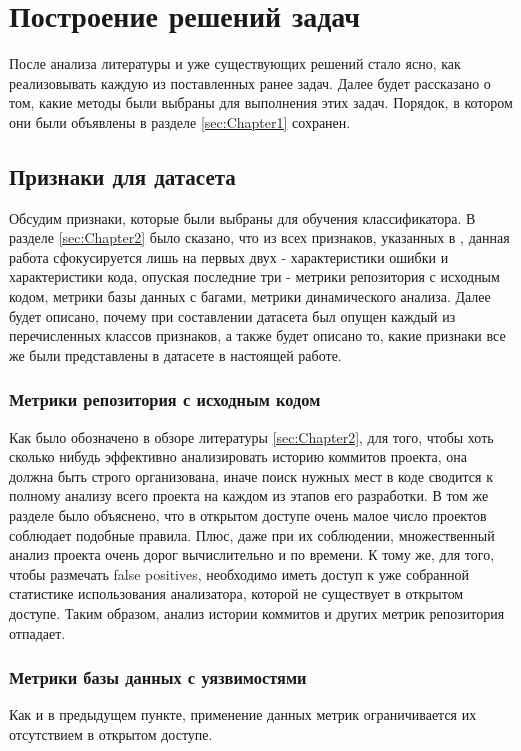 \section{Построение решений задач}
\label{sec:Chapter3} 

После анализа литературы и уже существующих решений стало ясно, как реализовывать каждую из поставленных ранее задач. Далее будет рассказано о том, какие методы были выбраны для выполнения этих задач. Порядок, в котором они были объявлены в разделе \ref{sec:Chapter1} сохранен.

\subsection{Признаки для датасета}
\label{sec:dataset} 

Обсудим признаки, которые были выбраны для обучения классификатора. В разделе \ref{sec:Chapter2} было сказано, что из всех признаков, указанных в \cite{HECKMAN2011363}, данная работа сфокусируется лишь на первых двух - характеристики ошибки и характеристики кода, опуская последние три - метрики репозитория с исходным кодом, метрики базы данных с багами, метрики динамического анализа. Далее будет описано, почему при составлении датасета был опущен каждый из перечисленных классов признаков, а также будет описано то, какие признаки все же были представлены в датасете в настоящей работе.

\subsubsection{Метрики репозитория с исходным кодом}
Как было обозначено в обзоре литературы \ref{sec:Chapter2}, для того, чтобы хоть сколько нибудь эффективно анализировать историю коммитов проекта, она должна быть строго организована, иначе поиск нужных мест в коде сводится к полному анализу всего проекта на каждом из этапов его разработки. В том же разделе было объяснено, что в открытом доступе очень малое число проектов соблюдает подобные правила. Плюс, даже при их соблюдении, множественный анализ проекта очень дорог вычислительно и по времени. К тому же, для того, чтобы размечать false positives, необходимо иметь доступ к уже собранной статистике использования анализатора, которой не существует в открытом доступе. Таким образом, анализ истории коммитов и других метрик репозитория отпадает.

\subsubsection{Метрики базы данных с уязвимостями}
Как и в предыдущем пункте, применение данных метрик ограничивается их отсутствием в открытом доступе.

